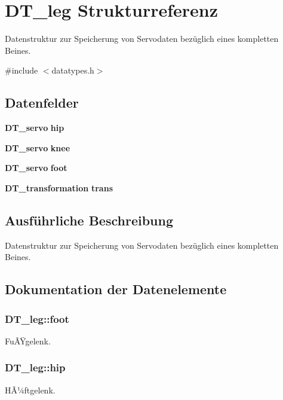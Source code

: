 \section{DT\_\-leg Strukturreferenz}
\label{struct_d_t__leg}


Datenstruktur zur Speicherung von Servodaten bezüglich eines kompletten Beines.  




{\ttfamily \#include $<$datatypes.h$>$}

\subsection*{Datenfelder}
\begin{DoxyCompactItemize}
\item 
{\bf DT\_\-servo} {\bf hip}
\item 
{\bf DT\_\-servo} {\bf knee}
\item 
{\bf DT\_\-servo} {\bf foot}
\item 
{\bf DT\_\-transformation} {\bf trans}
\end{DoxyCompactItemize}


\subsection{Ausführliche Beschreibung}
Datenstruktur zur Speicherung von Servodaten bezüglich eines kompletten Beines. 

\subsection{Dokumentation der Datenelemente}
\subsubsection[{foot}]{ {\bf DT\_\-leg::foot}}\label{struct_d_t__leg_a743e80e253be434a49d23d17fbe2381d}
FuÃŸgelenk. 
\subsubsection[{hip}]{ {\bf DT\_\-leg::hip}}\label{struct_d_t__leg_a4a243dbf8f28a55e64dd703710313722}
HÃ¼ftgelenk. 
